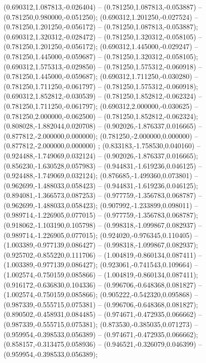  (0.690312,1.087813,-0.026404) -- (0.781250,1.087813,-0.053887) -- (0.781250,0.980000,-0.051250);
 (0.690312,1.201250,-0.027524) -- (0.781250,1.201250,-0.056172) -- (0.781250,1.087813,-0.053887);
 (0.690312,1.320312,-0.028472) -- (0.781250,1.320312,-0.058105) -- (0.781250,1.201250,-0.056172);
 (0.690312,1.445000,-0.029247) -- (0.781250,1.445000,-0.059687) -- (0.781250,1.320312,-0.058105);
 (0.690312,1.575313,-0.029850) -- (0.781250,1.575312,-0.060918) -- (0.781250,1.445000,-0.059687);
 (0.690312,1.711250,-0.030280) -- (0.781250,1.711250,-0.061797) -- (0.781250,1.575312,-0.060918);
 (0.690312,1.852812,-0.030539) -- (0.781250,1.852812,-0.062324) -- (0.781250,1.711250,-0.061797);
 (0.690312,2.000000,-0.030625) -- (0.781250,2.000000,-0.062500) -- (0.781250,1.852812,-0.062324);
 (0.808028,-1.882044,0.020708) -- (0.902026,-1.876337,0.016665) -- (0.877812,-2.000000,0.000000);
 (0.781250,-2.000000,0.000000) -- (0.877812,-2.000000,0.000000) ;
 (0.833183,-1.758530,0.040160) -- (0.924488,-1.749069,0.032124) -- (0.902026,-1.876337,0.016665);
 (0.856230,-1.630528,0.057983) -- (0.944831,-1.619236,0.046125) -- (0.924488,-1.749069,0.032124);
 (0.876685,-1.499360,0.073801) -- (0.962699,-1.488033,0.058423) -- (0.944831,-1.619236,0.046125);
 (0.894081,-1.366573,0.087253) -- (0.977759,-1.356783,0.068787) -- (0.962699,-1.488033,0.058423);
 (0.907992,-1.233899,0.098011) -- (0.989714,-1.226905,0.077015) -- (0.977759,-1.356783,0.068787);
 (0.918062,-1.103190,0.105798) -- (0.998318,-1.099867,0.082937) -- (0.989714,-1.226905,0.077015);
 (0.924020,-0.976345,0.110405) -- (1.003389,-0.977139,0.086427) -- (0.998318,-1.099867,0.082937);
 (0.925702,-0.855220,0.111706) -- (1.004819,-0.860134,0.087411) -- (1.003389,-0.977139,0.086427);
 (0.923061,-0.741543,0.109664) -- (1.002574,-0.750159,0.085866) -- (1.004819,-0.860134,0.087411);
 (0.916172,-0.636830,0.104336) -- (0.996706,-0.648368,0.081827) -- (1.002574,-0.750159,0.085866);
 (0.905222,-0.542320,0.095868) -- (0.987339,-0.555715,0.075381) -- (0.996706,-0.648368,0.081827);
 (0.890502,-0.458931,0.084485) -- (0.974671,-0.472935,0.066662) -- (0.987339,-0.555715,0.075381);
 (0.873530,-0.385035,0.071273) -- (0.959954,-0.398533,0.056389) -- (0.974671,-0.472935,0.066662);
 (0.858157,-0.313475,0.058936) -- (0.946521,-0.326079,0.046399) -- (0.959954,-0.398533,0.056389);
